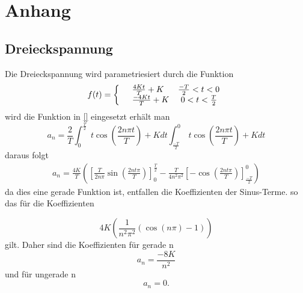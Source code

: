 \section{Anhang}
\label{Anhang}
\subsection{Dreieckspannung}
\label{Dreieckspannung}
Die Dreieckspannung wird parametriesiert durch die Funktion
\begin{equation*}
  f(t)=\left\{
  \begin{array}{l l}
    &\frac{4Kt}{T}+K   \;\;\;\;\;\;\frac{-T}{2}<t<0 \\
    &\frac{-4Kt}{T}+K  \;\;\;\;\;0<t<\frac{T}{2}
  \end{array}
  \right.
\end{equation*}
wird die Funktion in \eqref{} eingesetzt erhält man
\begin{equation*}
  a_n=\frac{2}{T}\int^{\frac{T}{2}}_0 \;t \cos(\frac{2n \pi t}{T} ) + K dt
  \int^0_{\frac{-T}{2}} \; t \cos(\frac{2n\pi t}{T} ) + K dt
\end{equation*}
daraus folgt
\begin{align*}
  a_n=\frac{4K}{T}\left(\left[ \frac{T}{2n\pi}\sin(\frac{2nt\pi}{T})\right]^\frac{T}{2}_0
  -\frac{T}{4n^2\pi^2}\left[-\cos(\frac{2nt\pi}{T})\right]^0_\frac{-T}{2} \right)
\end{align*}
da dies eine gerade Funktion ist, entfallen die Koeffizienten der Sinus-Terme.
so das für die Koeffizienten

\begin{equation}
  4K\left(\frac{1}{n^2\pi^2}(\cos(n\pi)-1)\right)
\end{equation}
gilt. Daher sind die Koeffizienten für gerade n
\begin{equation*}
a_n=\frac{-8K}{n^2}
\end{equation*}
und für ungerade n
\begin{equation*}
  a_n=0.
\end{equation*}
